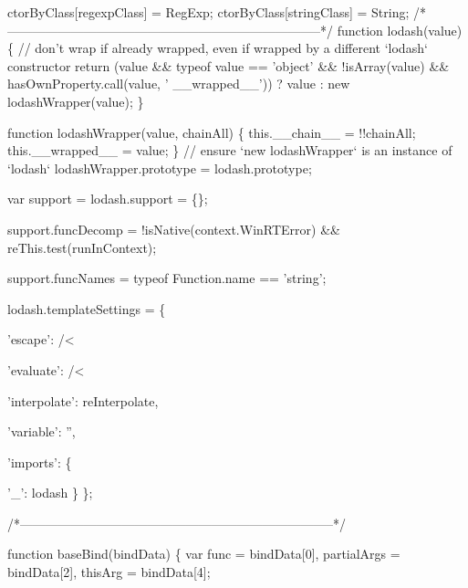 \begin{DoxyCodeInclude}
\textcolor{stringliteral}{    ctorByClass[regexpClass] = RegExp;}
\textcolor{stringliteral}{    ctorByClass[stringClass] = String;}
\textcolor{stringliteral}{}
\textcolor{stringliteral}{    /*--------------------------------------------------------------------------*/}
\textcolor{stringliteral}{}
\textcolor{stringliteral}{    function lodash(value) \{}
\textcolor{stringliteral}{      // don'}t wrap \textcolor{keywordflow}{if} already wrapped, even \textcolor{keywordflow}{if} wrapped by a different `lodash` constructor
      \textcolor{keywordflow}{return} (value && typeof value == \textcolor{stringliteral}{'object'} && !isArray(value) && hasOwnProperty.call(value, \textcolor{stringliteral}{'
      \_\_wrapped\_\_'}))
       ? value
       : \textcolor{keyword}{new} lodashWrapper(value);
    \}

    \textcolor{keyword}{function} lodashWrapper(value, chainAll) \{
      this.\_\_chain\_\_ = !!chainAll;
      this.\_\_wrapped\_\_ = value;
    \}
    \textcolor{comment}{// ensure `new lodashWrapper` is an instance of `lodash`}
    lodashWrapper.prototype = lodash.prototype;

    var support = lodash.support = \{\};

    support.funcDecomp = !isNative(context.WinRTError) && reThis.test(runInContext);

    support.funcNames = typeof Function.name == \textcolor{stringliteral}{'string'};

    lodash.templateSettings = \{

      \textcolor{stringliteral}{'escape'}: /<%

      \textcolor{stringliteral}{'evaluate'}: /<%

      \textcolor{stringliteral}{'interpolate'}: reInterpolate,

      \textcolor{stringliteral}{'variable'}: \textcolor{stringliteral}{''},

      \textcolor{stringliteral}{'imports'}: \{

        \textcolor{charliteral}{'\_'}: lodash
      \}
    \};

    \textcolor{comment}{/*--------------------------------------------------------------------------*/}

    \textcolor{keyword}{function} baseBind(bindData) \{
      var func = bindData[0],
          partialArgs = bindData[2],
          thisArg = bindData[4];


\end{DoxyCodeInclude}
